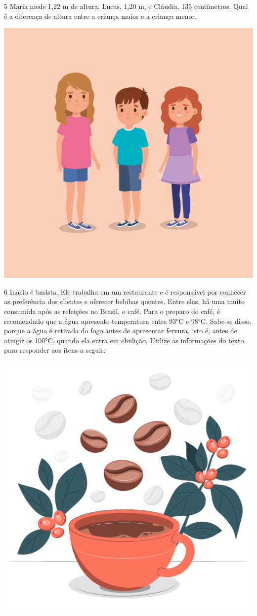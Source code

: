 \num{5} Maria mede 1,22 m de altura, Lucas, 1,20 m, e Cláudia, 135 centímetros. 
Qual é a diferença de altura entre a criança maior e a criança menor. 

\begin{center}
\includegraphics[width=.7\textwidth]{media/image24a.jpeg}
\end{center}


\num{6} Inácio é barista. Ele trabalha em um restaurante e é responsável
por conhecer as preferência dos clientes e oferecer bebibas quentes. Entre elas, há uma muito consumida após as refeições no Brasil, o café. Para o preparo do café, é recomendado que a água apresente temperatura entre 93°C e 98°C. Sabe-se disso, porque a água é retirada do fogo antes de apresentar fervura, isto é, antes de atingir os 100°C, quando ela entra em ebulição. Utilize as informações do texto para responder aos itens a seguir.

\begin{center}
\includegraphics[width=.4\textwidth]{media/image24c.jpeg}
\end{center}

